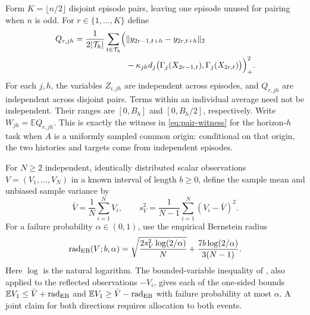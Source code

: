 Form $K=\lfloor n/2\rfloor$ disjoint episode pairs, leaving one episode
unused for pairing when $n$ is odd. For $r\in\{1,\ldots,K\}$ define
\begin{equation}
\begin{split}
 Q_{r,jh}=\frac1{2|\mathcal T_h|}\sum_{t\in\mathcal T_h}
 \Bigl(&\|y_{2r-1,t+h}-y_{2r,t+h}\|_2\\
 &-\kappa_{jh}d_j\bigl(\Gamma_j(X_{2r-1,t}),
                         \Gamma_j(X_{2r,t})\bigr)\Bigr)_+^2.
\end{split}
 \label{eq:episode-pairs}
\end{equation}
For each $j,h$, the variables $Z_{i,jh}$ are independent across episodes,
and $Q_{r,jh}$ are independent across disjoint pairs. Terms within an
individual average need not be independent. Their ranges are $[0,B_h]$
and $[0,B_h/2]$, respectively. Write
$W_{jh}=\mathbb E Q_{r,jh}$. This is exactly the witness in
\eqref{eq:pair-witness} for the horizon-$h$ task when $A$ is a uniformly
sampled common origin: conditional on that origin, the two histories and
targets come from independent episodes.

For $N\geq2$ independent, identically distributed scalar observations
$V=(V_1,\ldots,V_N)$ in a known interval of length $b\geq0$, define the
sample mean and unbiased sample variance by
\[
 \bar V=\frac1N\sum_{i=1}^N V_i,
 \qquad s_V^2=\frac1{N-1}\sum_{i=1}^N(V_i-\bar V)^2.
\]
For a failure probability $\alpha\in(0,1)$, use the
empirical Bernstein radius
\begin{equation}
 \operatorname{rad}_{\rm EB}(V;b,\alpha)
 =\sqrt{\frac{2s_V^2\log(2/\alpha)}{N}}
       +\frac{7b\log(2/\alpha)}{3(N-1)}.
 \label{eq:eb-radius}
\end{equation}
Here $\log$ is the natural logarithm. The bounded-variable inequality of
\citet[Theorem~4]{maurer2009empirical}, also applied to the reflected observations
$-V_i$, gives each of the one-sided bounds
$\mathbb EV_1\leq\bar V+\operatorname{rad}_{\rm EB}$ and
$\mathbb EV_1\geq\bar V-\operatorname{rad}_{\rm EB}$ with failure
probability at most $\alpha$. A joint claim for both directions requires
allocation to both events.

